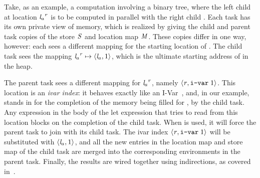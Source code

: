 
Take, as an example, a \ourcalc{} computation involving a binary tree, where the
left child  at location ${\mathit{l}_a}^{\mathit{r}}$ is to be computed in
parallel with the right child .
Each task has its own private view of memory, which is realized by
giving the child and parent task copies of the store $\mathit{S}$ and
location map $\mathit{M}$.
%
These copies differ in one way, however: each sees a different mapping
for the starting location of . %
%
The child task sees the mapping
${\mathit{l}_a}^{\mathit{r}} \mapsto \langle \mathit{l}_a, 1 \rangle ^{}$, which
is the ultimate starting address of  in the heap.

The parent task sees a different mapping for ${\mathit{l}_a}^{\mathit{r}}$,
namely $\langle \mathit{r}, \texttt{i-var}\; 1 \rangle ^{}$.
%
This location is an \emph{ivar index}: it behaves exactly like an I-Var~\cite{IStructures},
and, in our example, stands in for the completion of the memory being
filled for , by the child task.
%
Any expression in the body of the let expression that tries to read
from this location blocks on the completion of the child task.
%
When  is used, it will force the parent task to join with
its child task. The ivar index $\langle \mathit{r}, \texttt{i-var}\; 1 \rangle ^{}$
will be substituted with $\langle \mathit{l}_a, 1 \rangle ^{}$, and
all the new entries in the location map and store map of the
child task are merged into the corresponding environments in
the parent task. Finally, the results are wired together using
indirections, as covered in~.

